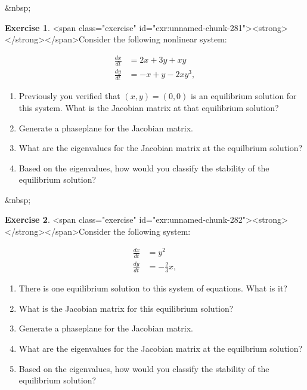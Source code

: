 \documentclass[
]{book}
\theoremstyle{definition}
\theoremstyle{definition}
\theoremstyle{definition}
\newtheorem{exercise}{Exercise}[chapter]
\theoremstyle{remark}
\begin{document}
&nbsp;
\begin{exercise}
<span class="exercise" id="exr:unnamed-chunk-281"><strong>\label{exr:unnamed-chunk-281} </strong></span>Consider the following nonlinear system:

\begin{equation}
\begin{split}
\frac{dx}{dt} &= 2x+3y+xy \\
\frac{dy}{dt} &= -x + y - 2xy^{3},
\end{split}
\end{equation}  

\begin{enumerate}[label=\alph*.]
\item Previously you verified that $(x,y)=(0,0)$ is an equilibrium solution for this system.  What is the Jacobian matrix at that equilibrium solution?
\item Generate a phaseplane for the Jacobian matrix.
\item What are the eigenvalues for the Jacobian matrix at the equilbrium solution?
\item Based on the eigenvalues, how would you classify the stability of the equilibrium solution?
\end{enumerate}
\end{exercise}
&nbsp;


\begin{exercise}
<span class="exercise" id="exr:unnamed-chunk-282"><strong>\label{exr:unnamed-chunk-282} </strong></span>Consider the following system:

\begin{equation}
\begin{split}
\frac{dx}{dt} &= y^{2} \\
\frac{dy}{dt} &= -\frac{2}{3} x,
\end{split}
\end{equation}  

\begin{enumerate}[label=\alph*.]
\item There is one equilibrium solution to this system of equations.  What is it?
\item What is the Jacobian matrix for this equilibrium solution?
\item Generate a phaseplane for the Jacobian matrix.
\item What are the eigenvalues for the Jacobian matrix at the equilbrium solution?
\item Based on the eigenvalues, how would you classify the stability of the equilibrium solution?
\end{enumerate}
\end{exercise}
\end{document}
